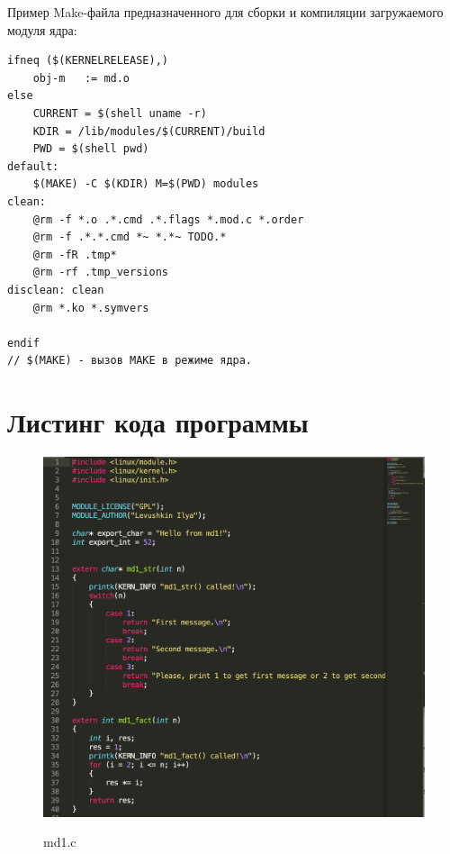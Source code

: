 \documentclass[a4paper,12pt]{article}
\begin{document}
	Пример Make-файла предназначенного для сборки и компиляции загружаемого модуля ядра:
	
	\begin{verbatim}
ifneq ($(KERNELRELEASE),)
	obj-m   := md.o
else
	CURRENT = $(shell uname -r)
	KDIR = /lib/modules/$(CURRENT)/build 
	PWD = $(shell pwd)
default: 
	$(MAKE) -C $(KDIR) M=$(PWD) modules 
clean: 
	@rm -f *.o .*.cmd .*.flags *.mod.c *.order 
	@rm -f .*.*.cmd *~ *.*~ TODO.* 
	@rm -fR .tmp* 
	@rm -rf .tmp_versions 
disclean: clean 
	@rm *.ko *.symvers 

endif
// $(MAKE) - вызов MAKE в режиме ядра. 
	\end{verbatim}
	
	\newpage
	
	\section*{Листинг кода программы}
	
	\begin{figure}[h!]
		\begin{center}
			{\includegraphics[scale = 0.7]{listing_md1.png}}
			\label{listing_md1}
		\end{center}
		\caption{md1.c}
	\end{figure}

	\newpage
\end{document}
